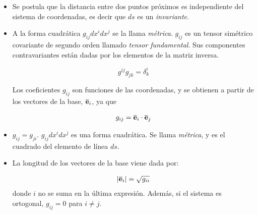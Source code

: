 \begin{remark}
\begin{itemize}

\item
Se postula que la distancia entre dos puntos próximos es independiente del sistema de coordenadas, es decir que $ds$ es un \textit{invariante}. 

\item

A la forma cuadrática $  g_{ij}dx^{i}dx^{j}$ se la llama \textit{métrica}.   $ g_{ij}$  es un tensor simétrico covariante de segundo orden llamado \textit{tensor fundamental}.  Sus componentes contravariantes están dadas por los elementos de la matriz inversa.



\begin{equation}
g^{ij}g_{jk} =\delta^{i}_{k}
\end{equation}

\bigskip 








\bigskip

Los coeficientes $g_{ij}$ son funciones de las coordenadas, y se obtienen a partir de  los vectores de la base, $\overline {\bold{e}}_{i}$, ya que 

\bigskip

\begin{eqnarray}\label{ec_9}
g_{ij}= \overline {\bold{e}}_{i}\cdot \overline {\bold{e}}_{j}
\end{eqnarray}
\bigskip

\item
$g_{ij}= g_{ji}$.  $ g_{ij} dx^{i} dx^{j}  $ es una forma cuadrática. Se llama  \textit{métrica}, y es el cuadrado del elemento de línea $ds$.

\item

La longitud de los vectores de la base  viene dada por:

\begin{eqnarray}\label{ec_10}
\left| \overline {\bold{e}}_i\right| =\sqrt{g_{ii}}
\end{eqnarray}
donde $i$ no se suma en la última expresión. Además, si el sistema es ortogonal, $g_{ij}=0$ para $i\neq j$.


\end{itemize}
\end{remark}
